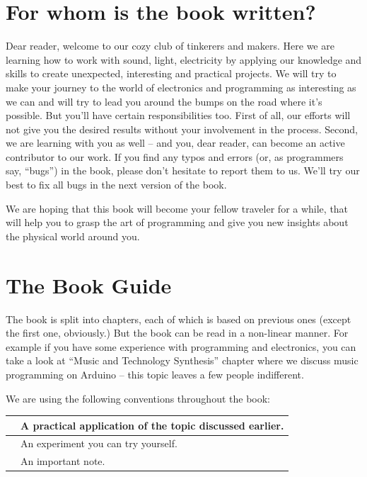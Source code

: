 \documentclass[../sparc.tex]{subfiles}
\begin{document}
\section*{For whom is the book written?}

Dear reader, welcome to our cozy club of tinkerers and makers.  Here we are
learning how to work with sound, light, electricity by applying our knowledge
and skills to create unexpected, interesting and practical projects.  We will
try to make your journey to the world of electronics and programming as
interesting as we can and will try to lead you around the bumps on the road
where it's possible.  But you'll have certain responsibilities too.  First of
all, our efforts will not give you the desired results without your involvement
in the process.  Second, we are learning with you as well -- and you, dear
reader, can become an active contributor to our work.  If you find any typos and
errors (or, as programmers say, ``bugs'') in the book, please don't hesitate to
report them to us.  We'll try our best to fix all bugs in the next version of
the book.

We are hoping that this book will become your fellow traveler for a while, that
will help you to grasp the art of programming and give you new insights about
the physical world around you.

\section*{The Book Guide}

The book is split into chapters, each of which is based on previous ones (except
the first one, obviously.)  But the book can be read in a non-linear manner.
For example if you have some experience with programming and electronics, you
can take a look at ``Music and Technology Synthesis'' chapter where we discuss
music programming on Arduino -- this topic leaves a few people indifferent.

We are using the following conventions throughout the book:

\begin{table}[H]
  \centering
  \def\arraystretch{3.0}%
  \begin{tabular}{|m{4em}|m{24em}|}
    \hline
    
    & A practical application of the topic discussed earlier. \\
    \hline
    
    & An experiment you can try yourself. \\
    \hline
    
    & An important note. \\
    \hline
  \end{tabular}
\end{table}
\end{document}

